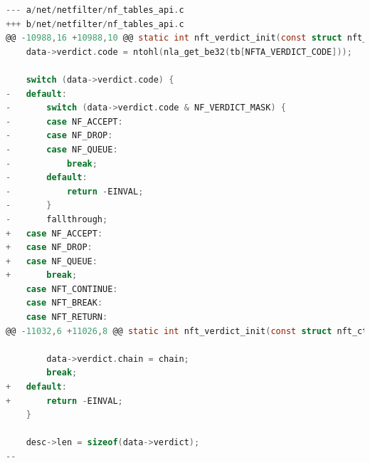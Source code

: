 \documentclass{article}
\begin{document}
\begin{lstlisting}[language=C,style=CStyle,caption="Commit applicato per mitigare la vulnerabilità"]
--- a/net/netfilter/nf_tables_api.c
+++ b/net/netfilter/nf_tables_api.c
@@ -10988,16 +10988,10 @@ static int nft_verdict_init(const struct nft_ctx *ctx, struct nft_data *data,
 	data->verdict.code = ntohl(nla_get_be32(tb[NFTA_VERDICT_CODE]));
 
 	switch (data->verdict.code) {
-	default:
-		switch (data->verdict.code & NF_VERDICT_MASK) {
-		case NF_ACCEPT:
-		case NF_DROP:
-		case NF_QUEUE:
-			break;
-		default:
-			return -EINVAL;
-		}
-		fallthrough;
+	case NF_ACCEPT:
+	case NF_DROP:
+	case NF_QUEUE:
+		break;
 	case NFT_CONTINUE:
 	case NFT_BREAK:
 	case NFT_RETURN:
@@ -11032,6 +11026,8 @@ static int nft_verdict_init(const struct nft_ctx *ctx, struct nft_data *data,
 
 		data->verdict.chain = chain;
 		break;
+	default:
+		return -EINVAL;
 	}
 
 	desc->len = sizeof(data->verdict);
--  
\end{lstlisting}
\clearpage

\nocite{*}


\end{document}
